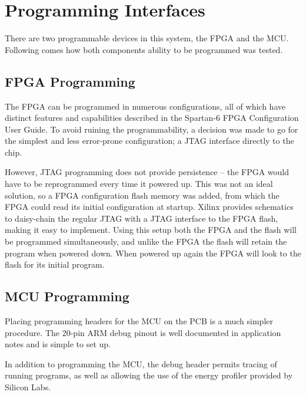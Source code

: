 
\section{Programming Interfaces}

There are two programmable devices in this system, the FPGA and the MCU.
Following comes how both components ability to be programmed was tested.

\subsection{FPGA Programming}
The FPGA can be programmed in numerous configurations, all of which have
distinct features and capabilities described in the
Spartan-6 FPGA Configuration User Guide\cite{fpga:config-user-guide}. To avoid ruining the programmability, a
decision was made to go for the simplest and less error-prone configuration; a
JTAG interface directly to the chip.

However, JTAG programming does not provide persistence -- the FPGA would have to
be reprogrammed every time it powered up. This was not an ideal solution, so a
FPGA configuration flash memory was added, from which the FPGA could read its
initial configuration at startup. Xilinx provides schematics to daisy-chain the
regular JTAG with a JTAG interface to the FPGA flash, making it easy to
implement. Using this setup both the FPGA and the flash will be programmed
simultaneously, and unlike the FPGA the flash will retain the program when
powered down. When powered up again the FPGA will look to the flash for its
initial program.

\subsection{MCU Programming}
Placing programming headers for the MCU on the PCB is a much simpler procedure.
The 20-pin ARM debug pinout is well documented in application notes and is
simple to set up.

In addition to programming the MCU, the debug header permits tracing of running
programs, as well as allowing the use of the energy profiler provided by Silicon Labs.
